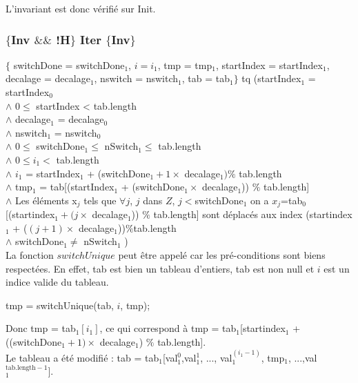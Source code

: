 L'invariant est donc vérifié sur Init.

\subsubsection*{$\{$Inv $\&\&$ !H$\}$ Iter $\{$Inv$\}$}

$\{$ switchDone = switchDone$_{1}$, $i = i_{1}$, tmp = tmp$_{1}$, startIndex = startIndex$_{1}$, decalage = decalage$_{1}$, nswitch = nswitch$_{1}$, tab = tab$_{1} \}$ tq (startIndex$_{1}$ = startIndex$_{0}$\\
$\wedge$ $0 \leq$ startIndex < tab.length \\
$\wedge$ decalage$_{1}$ = decalage$_{0}$\\
$\wedge$ nswitch$_{1}$ = nswitch$_{0}$\\
$\wedge$ $0\leq$ switchDone$_{1} \leq$ nSwitch$_{1} \leq$ tab.length\\
$\wedge$ $0\leq i_{1} <$ tab.length\\
$\wedge$ $i_{1}$ = startIndex$_{1}$ + (switchDone$_{1}+1\times $ decalage$_{1}) \%$ tab.length\\
$\wedge$ tmp$_{1}$ = tab[(startIndex$_{1}$ + (switchDone$_{1}\times$  decalage$_{1}$)) $\%$ tab.length]\\
$\wedge$ Les éléments x$_{j}$ tels que $\forall j$, $j$ dans $Z$, $j<$switchDone$_{1}$ on a $x_{j}$=tab$_{0}$[(startindex$_{1} + (j\times$ decalage$_{1}$)) $\%$ tab.length] sont déplacés aux index (startindex$_{1}$ + ($(j+1)\times$ decalage$_{1}$))$\%$tab.length\\
$\wedge$ switchDone$_{1} \neq$ nSwitch$_{1}$ )\\

La fonction $switchUnique$ peut être appelé car les pré-conditions sont biens respectées. En effet, tab est bien un tableau d'entiers, tab est non null et $i$ est un indice valide du tableau. \\

\begin{center}
tmp = switchUnique(tab, $i$, tmp);\\
\end{center}

Donc tmp = tab$_{1}[i_1]$, ce qui correspond à tmp = tab$_{1}$[startindex$_{1}$ + ((switchDone$_{1}+1)\times$ decalage$_{1}$) $\%$ tab.length].\\

Le tableau a été modifié : tab = tab$_{1}$[val$_{1}^{0}$,val$_{1}^{1}$, ..., val$_{1}^{(i_{1}-1)}$, tmp$_{1}$, ...,val$_{1}^{\mathrm{tab.length-1}}]$.\\

